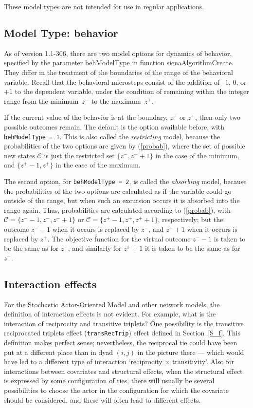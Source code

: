 \documentclass[a4paper,fleqn,11pt]{article}
\newcommand{\+}{\, + \,}
\newcommand{\sfn}[1]{\textsf{#1}}
\newcommand{\SAOM}{{Stochastic Actor-Oriented Model }}
\begin{document}
These model types are not intended for use in regular applications.



\subsection{Model Type: behavior}
\label{S_modeltype_beh}

As of version 1.1-306, there are two model options for dynamics
of behavior, specified by the parameter \sfn{behModelType} in function
\textsf{sienaAlgorithmCreate}.
They differ in the treatment of the boundaries of the range of
the behavioral variable.
Recall that the behavioral microsteps consist of the addition
of --1, 0, or +1 to the dependent variable, under the condition
of remaining within the integer range from the minimum~$z^-$ to
the maximum~$z^+$.

If the current value of the behavior is at the boundary,
$z^-$ or $z^+$, then only two possible outcomes remain.
The default is the option available before, with
\texttt{behModelType = 1}. This is also called the \emph{restricting}
model, because the probabilities of the two options are given by
(\ref{probab}), where the set of possible new states
$\mathcal C$ is just the restricted set $\{z^-, z^-+1\}$ in the case
of the minimum, and $\{z^+-1, z^+\}$ in the case of the maximum.

The second option, for
\texttt{behModelType = 2}, is called the \emph{absorbing}
model, because the probabilities of the two options are calculated
as if the variable could go outside of the range, but when such an excursion
occurs it is absorbed into the range again.
Thus, probabilities are calculated according to
(\ref{probab}), with
$\mathcal C = \{z^--1, z^-, z^-+1\}$ or
$\mathcal C = \{z^+-1, z^+, z^++1\}$,
respectively; but the outcome $z^--1$ when it occurs is replaced
by $z^-$, and  $z^++1$ when it occurs is replaced
by $z^+$.
The objective function for the virtual outcome $z^--1$
is taken to be the same as for $z^-$, and similarly for $z^++1$
it is taken to be the same as for $z^+$.


\hypertarget{T_int_eff}{
\subsection{Interaction effects}
}
\label{S_int_eff}

For the \SAOM and other network models, the definition of interaction
effects is not evident. For example, what is the interaction of
reciprocity and transitive triplets? One possibility is the
transitive reciprocated triplets effect (\texttt{transRecTrip})
effect defined in Section~\ref{S_f}.
This definition makes perfect sense; nevertheless, the reciprocal tie could
have been put at a different place than in dyad $(i,j)$
in the picture there --- which would have led
to a different type of interaction `reciprocity $\times$ transitivity'.
Also for interactions between covariates and structural effects,
when the structural effect is expressed by some configuration of ties,
there will usually be several possibilities to choose the actor in the
configuration for which the covariate should be considered, and these will
often lead to different effects.
\end{document}

